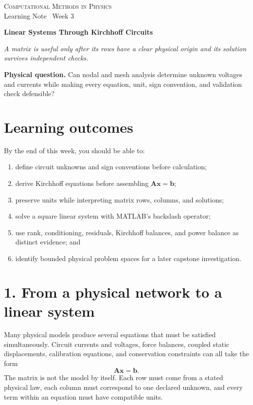 \documentclass[11pt,a4paper]{article}
\newcommand{\course}{Computational Methods in Physics}
\begin{document}
{\large\textsc{\course}}\\[-2pt]
{\small Learning Note \textbar\ Week 3}\par\vspace{4pt}
{\LARGE\bfseries Linear Systems Through Kirchhoff Circuits}\par\vspace{3pt}
\textit{A matrix is useful only after its rows have a clear physical origin and its solution survives independent checks.}

\begin{keybox}
\textbf{Physical question.} Can nodal and mesh analysis determine unknown voltages and currents while making every equation, unit, sign convention, and validation check defensible?
\end{keybox}

\section*{Learning outcomes}
By the end of this week, you should be able to:
\begin{enumerate}[nosep,leftmargin=5mm]
  \item define circuit unknowns and sign conventions before calculation;
  \item derive Kirchhoff equations before assembling $\mathbf{A}\mathbf{x}=\mathbf{b}$;
  \item preserve units while interpreting matrix rows, columns, and solutions;
  \item solve a square linear system with MATLAB's backslash operator;
  \item use rank, conditioning, residuals, Kirchhoff balances, and power balance as distinct evidence; and
  \item identify bounded physical problem spaces for a later capstone investigation.
\end{enumerate}

\section*{1. From a physical network to a linear system}
Many physical models produce several equations that must be satisfied simultaneously. Circuit currents and voltages, force balances, coupled static displacements, calibration equations, and conservation constraints can all take the form
\begin{equation}
  \mathbf{A}\mathbf{x}=\mathbf{b}.
\end{equation}
The matrix is not the model by itself. Each row must come from a stated physical law, each column must correspond to one declared unknown, and every term within an equation must have compatible units.
\end{document}
